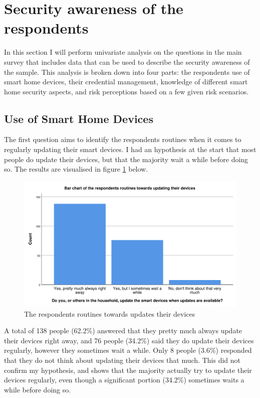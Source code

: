 \section{Security awareness of the respondents}
In this section I will perform univariate analysis on the questions in the main survey that includes data that can be used to describe the security awareness of the sample. This analysis is broken down into four parts: the respondents use of smart home devices, their credential management, knowledge of different smart home security aspects, and risk perceptions based on a few given risk scenarios. 

\subsection{Use of Smart Home Devices}
\label{subsec:use_smart_devices}
The first question aims to identify the respondents routines when it comes to regularly updating their smart devices. I had an hypothesis at the start that most people do update their devices, but that the majority wait a while before doing so. The results are visualised in figure \ref{fig:update} below.
\begin{figure}[!h]
    \centering
    \includegraphics[scale=0.55]{figures/diagrams/update.pdf}
    \caption{The respondents routines towards updates their devices}
    \label{fig:update}
\end{figure}
A total of 138 people (62.2\%) answered that they pretty much always update their devices right away, and 76 people (34.2\%) said they do update their devices regularly, however they sometimes wait a while. Only 8 people (3.6\%) responded that they do not think about updating their devices that much. This did not confirm my hypothesis, and shows that the majority actually try to update their devices regularly, even though a significant portion (34.2\%) sometimes waits a while before doing so. 

